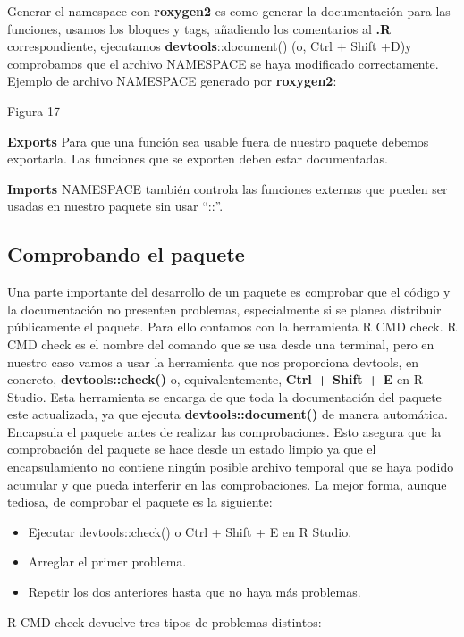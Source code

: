Generar el namespace con \textbf{roxygen2} es como generar la documentaci\'on para las funciones,
usamos los bloques y tags, a\~nadiendo los comentarios al \textbf{.R} correspondiente, ejecutamos
\textbf{devtools}::document() (o, Ctrl + Shift +D)y comprobamos que el archivo NAMESPACE se
haya modificado correctamente.
Ejemplo de archivo NAMESPACE generado por \textbf{roxygen2}:

Figura 17

\textbf{Exports}
Para que una funci\'on sea usable fuera de nuestro paquete debemos exportarla. Las funciones que se exporten deben estar documentadas.

\textbf{Imports}
NAMESPACE tambi\'en controla las funciones externas que pueden ser usadas en nuestro
paquete sin usar “::”.

\subsection{Comprobando el paquete}

Una parte importante del desarrollo de un paquete es comprobar que el c\'odigo y la
documentaci\'on no presenten problemas, especialmente si se planea distribuir p\'ublicamente
el paquete. Para ello contamos con la herramienta R CMD check.
R CMD check es el nombre del comando que se usa desde una terminal, pero en nuestro
caso vamos a usar la herramienta que nos proporciona devtools, en concreto,
\textbf{devtools::check()} o, equivalentemente, \textbf{Ctrl + Shift + E} en R Studio.
Esta herramienta se encarga de que toda la documentaci\'on del paquete este actualizada, ya
que ejecuta \textbf{devtools::document()} de manera autom\'atica.
Encapsula el paquete antes de realizar las comprobaciones. Esto asegura que la
comprobaci\'on del paquete se hace desde un estado limpio ya que el encapsulamiento no
contiene ning\'un posible archivo temporal que se haya podido acumular y que pueda interferir
en las comprobaciones.
La mejor forma, aunque tediosa, de comprobar el paquete es la siguiente:

\begin{itemize}
    \item Ejecutar devtools::check() o Ctrl + Shift + E en R Studio.
    \item Arreglar el primer problema.
    \item Repetir los dos anteriores hasta que no haya m\'as problemas.
\end{itemize}

R CMD check devuelve tres tipos de problemas distintos:

